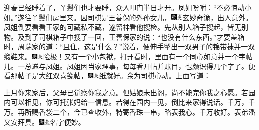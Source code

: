 迎春已经睡着了，丫鬟们也才要睡，众人叩门半日才开。凤姐吩咐：``不必惊动小姐。''遂往丫鬟们房里来。因司棋是王善保的外孙女儿，{\includegraphics[width=3mm]{../Images/00004}\includegraphics[width=3mm]{../Images/00012}\footnotesize \kaishu 玄妙奇诡，出人意外。}凤姐倒要看看王家的可藏私不藏，遂留神看他搜检。先从别人箱子搜起，皆无别物。及到了司棋箱子中搜了一回，王善保家的说：``也没有什么东西。''才要盖箱时，周瑞家的道：``且住，这是什么？''说着，便伸手掣出一双男子的锦带袜并一双缎鞋来。{\includegraphics[width=3mm]{../Images/00004}\includegraphics[width=3mm]{../Images/00012}\footnotesize \kaishu 险极！}又有一个小包袱，打开看时，里面有一个同心如意并一个字帖儿。一总递与凤姐。凤姐因当家理事，每每看开帖并账目，也颇识得几个字了。便看那帖子是大红双喜笺帖，{\includegraphics[width=3mm]{../Images/00004}\includegraphics[width=3mm]{../Images/00012}\footnotesize \kaishu 纸就好。余为司棋心动。}上面写道：

上月你来家后，父母已觉察你我之意。但姑娘未出阁，尚不能完你我之心愿。若园内可以相见，你可托张妈给一信息。若得在园内一见，倒比来家得说话。千万，千万。再所赐香袋二个，今已查收外，特寄香珠一串，略表我心。千万收好。表弟潘又安拜具。{\includegraphics[width=3mm]{../Images/00004}\includegraphics[width=3mm]{../Images/00012}\footnotesize \kaishu 名字便妙。}

